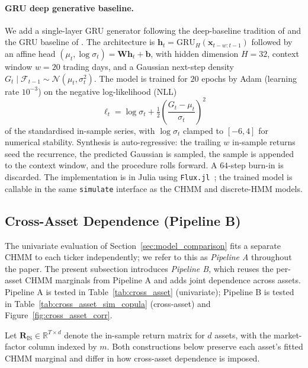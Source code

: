 \paragraph{GRU deep generative baseline.}
\label{sec:gru_methods}%
We add a single-layer GRU generator following the deep-baseline tradition of \citet{yoon2019timegan} and the GRU baseline of \citet{alswaidan2026hybrid}.
The architecture is $\mathbf{h}_t = \mathrm{GRU}_{H}(\mathbf{x}_{t-w:t-1})$ followed by an affine head $(\mu_t, \log \sigma_t) = \mathbf{W} \mathbf{h}_t + \mathbf{b}$, with hidden dimension $H = 32$, context window $w = 20$ trading days, and a Gaussian next-step density $G_t \mid \mathcal{F}_{t-1} \sim \mathcal{N}(\mu_t, \sigma_t^2)$.
The model is trained for $20$ epochs by Adam (learning rate $10^{-3}$) on the negative log-likelihood (NLL)
\begin{equation}
    \ell_t = \log \sigma_t + \tfrac{1}{2}\!\left(\frac{G_t - \mu_t}{\sigma_t}\right)^2
    \label{eq:gru_nll}
\end{equation}
of the standardised in-sample series, with $\log \sigma_t$ clamped to $[-6, 4]$ for numerical stability.
Synthesis is auto-regressive: the trailing $w$ in-sample returns seed the recurrence, the predicted Gaussian is sampled, the sample is appended to the context window, and the procedure rolls forward.
A $64$-step burn-in is discarded.
The implementation is in Julia using \texttt{Flux.jl}~\cite{innes2018flux}; the trained model is callable in the same \texttt{simulate} interface as the CHMM and discrete-HMM models.

\subsection{Cross-Asset Dependence (Pipeline B)}
\label{sec:cross_asset_methods}

The univariate evaluation of Section~\ref{sec:model_comparison} fits a separate CHMM to each ticker independently; we refer to this as \emph{Pipeline A} throughout the paper. The present subsection introduces \emph{Pipeline B}, which reuses the per-asset CHMM marginals from Pipeline A and adds joint dependence across assets. Pipeline A is tested in Table~\ref{tab:cross_asset} (univariate); Pipeline B is tested in Table~\ref{tab:cross_asset_sim_copula} (cross-asset) and Figure~\ref{fig:cross_asset_corr}.

Let $\mathbf{R}_{\text{IS}} \in \mathbb{R}^{T \times d}$ denote the in-sample return matrix for $d$ assets, with the market-factor column indexed by $m$.
Both constructions below preserve each asset's fitted CHMM marginal and differ in how cross-asset dependence is imposed.

